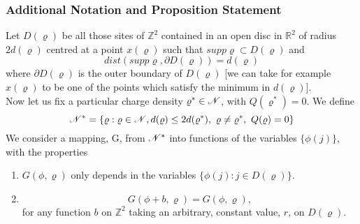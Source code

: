 \documentclass[11pt,reqno]{article}
\theoremstyle{definition}
\numberwithin{equation}{section}
\begin{document}
\subsubsection{Additional Notation and Proposition Statement}
Let $D(\varrho)$ be all those sites of $\mathbb{Z}^2$ contained in an open disc in $\mathbb{R}^2$ of radius $2d(\varrho)$ centred at a point $x(\varrho)$ such that $supp\varrho \subset D(\varrho)$ and
$$
dist(supp\varrho, \partial D(\varrho)) = d(\varrho)
$$
where $\partial D(\varrho)$ is the outer boundary of $D(\varrho)$ [we can take for example $x(\varrho)$ to be one of the points which satisfy the minimum in $d(\varrho)$].\\
Now let us fix a particular charge density $\varrho^* \in \mathscr{N}$, with $Q(\varrho^*)=0$.
We define 
$$
\mathscr{N}^* = \{\varrho: \varrho \in \mathscr{N}, d(\varrho)\leq 2d(\varrho^*),\ \varrho \neq \varrho^*,\  Q(\varrho)=0\}
$$
We consider a mapping, G, from $\mathscr{N}^*$ into functions of the variables $\{ \phi(j) \}$, with the properties
\begin{enumerate}
\item $G(\phi, \varrho)$ only depends in the variables $\{ \phi(j): j \in D(\varrho) \}$.
\item 
\begin{equation} \label{lab:eq428}
G(\phi + b, \varrho) = G(\phi, \varrho), 
\end{equation}
for any function $b$ on $\mathbb{Z}^2$ taking an arbitrary, constant value, $r$, on $D(\varrho)$.
\end{enumerate}
\end{document}

